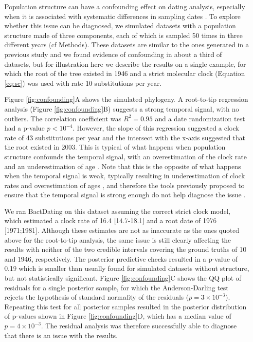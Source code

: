 \documentclass{article}
\begin{document}
Population structure can have a confounding effect on dating analysis, especially when
it is associated with systematic differences in sampling dates 
\citep{Duchene2015a,Murray2016,tongComparisonMethodsEstimating2018}.
To explore whether this issue can be diagnosed, we simulated datasets with a population structure 
made of three components, each of which is sampled 50 times in three different years (cf Methods).
These datasets are similar to the ones generated in a previous study \citep{Murray2016}
and we found evidence of confounding in about a third of datasets, but for illustration
here we describe the results on a single example, for which  
the root of the tree existed in 1946 and
a strict molecular clock (Equation \ref{eq:sc}) was used with rate 10 substitutions per year.

Figure \ref{fig:confounding}A shows the simulated phylogeny.
A root-to-tip regression analysis (Figure \ref{fig:confounding}B) suggests a strong temporal signal,
with no outliers. The correlation coefficient was $R^2=0.95$ and 
a date randomization test had a p-value $p<10^{-4}$. However, the slope of this regression
suggested a clock rate of 43 substitutions per year and the intersect with the x-axis suggested
that the root existed in 2003. This is typical of what happens when population structure
confounds the temporal signal, with an overestimation of the clock rate and an underestimation
of age \citep{Murray2016}. Note that this is the opposite of what happens when the temporal signal
is weak, typically resulting in underestimation of clock rates and overestimation of ages 
\citep{Duchene2015a}, and therefore the tools previously proposed to ensure that the temporal
signal is strong enough do not help diagnose the issue \citep{Murray2016}. 

We ran BactDating \citep{Didelot2018} on this dataset assuming the correct strict clock model, 
which estimated a clock rate of 
16.4 [14.7-18.1] and a root date of 1976 [1971;1981]. Although these estimates are not
as inaccurate as the ones quoted above for the root-to-tip analysis, the same issue is still clearly
affecting the results with neither of the two credible intervals covering the ground truths of 
10 and 1946, respectively. The posterior predictive checks resulted in a p-value of 0.19 which
is smaller than usually found for simulated datasets without structure, but not statistically significant.
Figure \ref{fig:confounding}C shows the QQ plot of residuals for a single posterior sample,
for which the Anderson-Darling test rejects the hypothesis of standard normality of the residuals ($p=3\times10^{-3}$). Repeating this test for all posterior samples resulted in the posterior distribution
of p-values shown in Figure \ref{fig:confounding}D, which has a median value of $p=4\times10^{-3}$.
The residual analysis was therefore successfully able to diagnose that there is an issue with the results.
\end{document}
